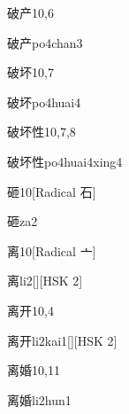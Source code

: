\begin{entry}{破产}{10,6}
  \begin{phonetics}{破产}{po4chan3}
  \end{phonetics}
\end{entry}

\begin{entry}{破坏}{10,7}
  \begin{phonetics}{破坏}{po4huai4}
  \end{phonetics}
\end{entry}

\begin{entry}{破坏性}{10,7,8}
  \begin{phonetics}{破坏性}{po4huai4xing4}
  \end{phonetics}
\end{entry}

\begin{entry}{砸}{10}[Radical 石]
  \begin{phonetics}{砸}{za2}
  \end{phonetics}
\end{entry}

\begin{entry}{离}{10}[Radical 亠]
  \begin{phonetics}{离}{li2}[][HSK 2]
  \end{phonetics}
\end{entry}

\begin{entry}{离开}{10,4}
  \begin{phonetics}{离开}{li2kai1}[][HSK 2]
  \end{phonetics}
\end{entry}

\begin{entry}{离婚}{10,11}
  \begin{phonetics}{离婚}{li2hun1}
  \end{phonetics}
\end{entry}

